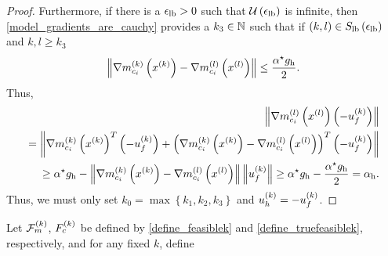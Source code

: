 \begin{proof}
Furthermore, if there is a ${\epsilon_{\textrm{lb}}} > 0$ such that ${\mathcal U\left(\epsilon_{\textrm{lb}}\right)}$ is infinite,
then \cref{model_gradients_are_cauchy} provides a $k_3 \in \mathbb N$ such that if $(k, l) \in {S_{\textrm{lb}}\left(\epsilon_{\textrm{lb}}\right)}$ and $k, l \ge k_3$
\begin{align*}
\left\|{\nabla m_{c_i}^{(k)}\left(x^{(k)}\right)} - {\nabla m_{c_i}^{(l)}\left({x^{(l)}}\right)}\right\| \le \frac {{ \alpha^{\star} } { g_{\textrm{h}} }} {2}.
\end{align*}
Thus,
\begin{align*}
\left\|{\nabla m_{c_i}^{(l)}\left({x^{(l)}}\right)} \left(-{u^{(k)}_f}\right) \right\| \\
= \left\|{\nabla m_{c_i}^{(k)}\left(x^{(k)}\right)}^T\left(-{u^{(k)}_f}\right) + \left({\nabla m_{c_i}^{(k)}\left(x^{(k)}\right)} - {\nabla m_{c_i}^{(l)}\left({x^{(l)}}\right)} \right)^T\left(-{u^{(k)}_f}\right)\right\| \\
\ge { \alpha^{\star} } { g_{\textrm{h}} } - \left\|{\nabla m_{c_i}^{(k)}\left(x^{(k)}\right)} - {\nabla m_{c_i}^{(l)}\left({x^{(l)}}\right)} \right\|\left\|{u^{(k)}_f}\right\|
\ge { \alpha^{\star} } { g_{\textrm{h}} } - \frac {{ \alpha^{\star} } { g_{\textrm{h}} }} {2} = { \alpha_{\textrm{h}} }.
\end{align*}
Thus, we must only set $k_0 = \max \left\{k_1, k_2, k_3\right\}$ and ${ u_{h}^{(k)} }=-{u^{(k)}_f}$.
\end{proof}




% 
% 
% 
% 
% 
% 
% 







Let ${\mathcal F_m^{(k)}}$, ${F_c^{(k)}}$ be defined by \cref{define_feasiblek} and \cref{define_truefeasiblek}, respectively,
and for any fixed $k$, define

